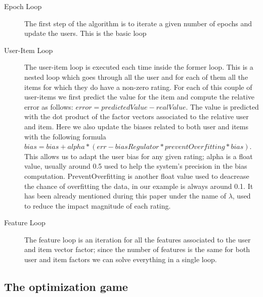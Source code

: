 \documentclass{sig-alternate-05-2015}
\begin{document}
\begin{description}
    \item[Epoch Loop] The first step of the algorithm is to iterate a given number of epochs and update the users. This
    is the basic loop
    \item[User-Item Loop] The user-item loop is executed each time inside the former loop. This is a nested loop
    which goes through all the user and for each of them all the items for which they do have a non-zero rating.
    For each of this couple of user-items we first predict the value for the item and compute the relative error
    as follows: $error = predictedValue - realValue$. The value is predicted with the dot product of the
    factor vectors associated to the relative user and item. Here we also update the biases related
    to both user and items with the following formula $bias = bias + alpha * (err - biasRegulator * preventOverfitting * bias)$.
    This allows us to adapt the user bias for any given rating; alpha is a float value, usually around 0.5
    used to help the system's precision in the bias computation. PreventOverfitting is another float value
    used to deacrease the chance of overfitting the data, in our example is always around 0.1. It has been already mentioned during
    this paper under the name of $\lambda$, used to reduce the impact magnitude of each rating.
    \item[Feature Loop] The feature loop is an iteration for all the features associated to the user and item vector factor;
    since the number of features is the same for both user and item factors we can solve everything in a single loop.


\end{description}



\subsection{The optimization game}
\end{document}
